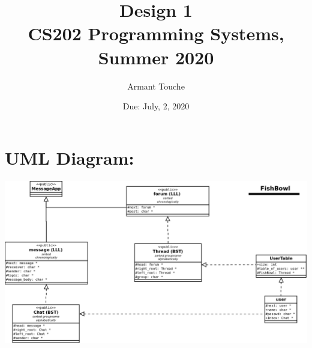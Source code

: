 \documentclass[11pt, a4paper]{article}
\title{\bf Design 1\\[1ex]
\rm\normalsize CS202 Programming Systems, Summer 2020 }
\date{\normalsize Due: July, 2, 2020}
\author{\normalsize Armant Touche}
\begin{document}
\vspace{0cm}\maketitle 

\section*{UML Diagram:}


            \begin{center}
            \includegraphics[width=.8\textwidth]{uml3}
            \end{center}
\end{document}
